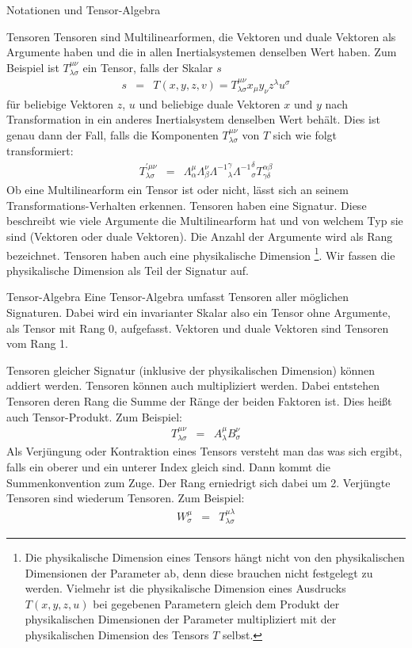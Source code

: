 \begin{chapter}{\titlestr}
\begin{section}{Notationen und Tensor-Algebra}
\begin{subsection}{Tensoren}
Tensoren sind Multilinearformen, die Vektoren und duale Vektoren als Argumente haben und die in allen Inertialsystemen denselben Wert haben. Zum Beispiel ist $T^{\mu\nu}_{\lambda\sigma}$ ein Tensor, falls der Skalar $s$
\begin{eqnarray*}
s &=& T(x,y, z,v)=T^{\mu\nu}_{\lambda\sigma}x_\mu y_\nu z^\lambda u^\sigma
\end{eqnarray*}
für beliebige Vektoren $z$, $u$ und beliebige duale Vektoren $x$ und $y$ nach Transformation in ein anderes Inertialsystem denselben Wert behält. Dies ist genau dann der Fall, falls die Komponenten $T^{\mu\nu}_{\lambda\sigma}$ von $T$ sich wie folgt transformiert:
\begin{eqnarray*}
T^{\prime\mu\nu}_{\lambda\sigma}
&=& \Lambda^\mu_\alpha\Lambda^\nu_\beta {\Lambda^{-1}}_\lambda^\gamma{\Lambda^{-1}}_\sigma^\delta T^{\alpha\beta}_{\gamma\delta}
\end{eqnarray*}
Ob eine Multilinearform ein Tensor ist oder nicht, lässt sich an seinem Transformations-Verhalten erkennen.
Tensoren haben eine Signatur. Diese beschreibt wie viele Argumente die Multilinearform hat und von welchem Typ sie sind
(Vektoren oder duale Vektoren). Die Anzahl der Argumente wird als Rang bezeichnet. Tensoren haben auch eine physikalische Dimension
\footnote{Die physikalische Dimension eines Tensors hängt nicht von den physikalischen Dimensionen der Parameter ab, denn diese brauchen nicht festgelegt zu werden. Vielmehr ist die physikalische Dimension eines Ausdrucks $T(x,y,z,u)$ bei gegebenen Parametern
gleich dem Produkt der physikalischen Dimensionen der Parameter multipliziert mit der physikalischen Dimension des Tensors $T$ selbst.}.
Wir fassen die physikalische Dimension als Teil der Signatur auf.
\end{subsection}

\begin{subsection}{Tensor-Algebra}
Eine Tensor-Algebra umfasst Tensoren aller möglichen Signaturen. Dabei wird ein invarianter Skalar also ein Tensor ohne Argumente, als Tensor mit Rang 0, aufgefasst. Vektoren und duale Vektoren sind Tensoren vom Rang 1.

Tensoren gleicher Signatur (inklusive der physikalischen Dimension) können addiert werden. Tensoren können auch multipliziert werden. Dabei entstehen Tensoren
deren Rang die Summe der Ränge der beiden Faktoren ist. Dies heißt auch Tensor-Produkt. Zum Beispiel:
\begin{eqnarray*}
T^{\mu\nu}_{\lambda\sigma}
&=& A^\mu_\lambda B^\nu_\sigma
\end{eqnarray*}
Als Verjüngung oder Kontraktion eines Tensors versteht man das was sich ergibt, falls ein oberer und ein unterer Index gleich sind. Dann kommt die Summenkonvention zum Zuge. Der Rang erniedrigt sich dabei um 2. Verjüngte Tensoren sind wiederum Tensoren. Zum Beispiel:
\begin{eqnarray*}
W^\mu_\sigma &=& T^{\mu\lambda}_{\lambda\sigma}
\end{eqnarray*}
\end{subsection}


\end{section}
\end{chapter}
